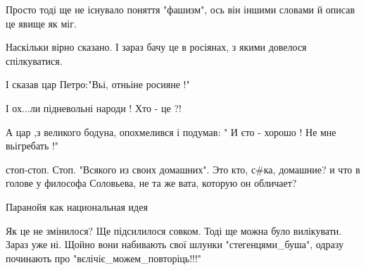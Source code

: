 \begin{itemize}
Просто тоді ще не існувало поняття "фашизм", ось він іншими словами й описав це явище як міг.

 
Наскільки вірно сказано. І зараз бачу це в росіянах, з якими довелося спілкуватися.

 

І сказав цар Петро:"Вьі, отньіне росияне !"

І ох...ли підневольні народи ! Хто - це ?!

А цар ,з великого бодуна, опохмелився і подумав: " И єто - хорошо ! Не мне
вьігребать !"


 

стоп-стоп. Стоп. "Всякого из своих домашних". Это кто, с\#ка, домашние? и что в
голове у философа Соловьева, не та же вата, которую он обличает?


 
Паранойя как национальная идея

 

Як це не змінилося? Ще підсилилося совком. Тоді ще можна було вилікувати. Зараз
уже ні. Щойно вони набивають свої шлунки "стегенцями\_буша", одразу починають
про "вєлічіє\_можем\_повторіць!!!"


 


\end{itemize}
